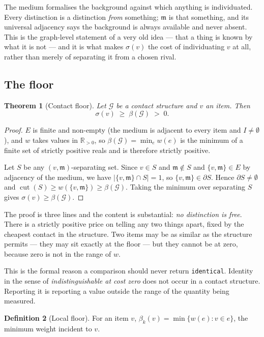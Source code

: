 \documentclass[11pt,twocolumn,a4paper]{article}
\theoremstyle{plain}
\newtheorem{theorem}{Theorem}[section]
\theoremstyle{definition}
\newtheorem{definition}[theorem]{Definition}
\theoremstyle{remark}
\newcommand{\flo}{\beta}                       %
\newcommand{\sep}{\sigma}                      %
\newcommand{\med}{\mathfrak{m}}                %
\newcommand{\Gph}{\mathcal{G}}
\newcommand{\Edg}{E}
\newcommand{\weight}{w}
\newcommand{\Rp}{\mathbb{R}_{>0}}
\DeclareMathOperator{\cut}{cut}
\begin{document}
The medium formalises the background against which anything is
individuated. Every distinction is a distinction \emph{from} something;
$\med$ is that something, and its universal adjacency says the
background is always available and never absent. This is the graph-level
statement of a very old idea --- that a thing is known by what it is not
--- and it is what makes $\sep(v)$ the cost of individuating $v$ at all,
rather than merely of separating it from a chosen rival.

\subsection{The floor}

\begin{theorem}[Contact floor]
\label{thm:floor}
Let $\Gph$ be a contact structure and $v$ an item. Then
\[
  \sep(v)\;\ge\;\flo(\Gph)\;>\;0.
\]
\end{theorem}

\begin{proof}
$\Edg$ is finite and non-empty (the medium is adjacent to every item and
$I\neq\emptyset$), and $\weight$ takes values in $\Rp$, so
$\flo(\Gph)=\min_{e}\weight(e)$ is the minimum of a finite set of
strictly positive reals and is therefore strictly positive.

Let $S$ be any $(v,\med)$-separating set. Since $v\in S$ and
$\med\notin S$ and $\{v,\med\}\in\Edg$ by adjacency of the medium, we
have $|\{v,\med\}\cap S|=1$, so $\{v,\med\}\in\partial S$. Hence
$\partial S\neq\emptyset$ and
$\cut(S)\ge\weight(\{v,\med\})\ge\flo(\Gph)$. Taking the minimum over
separating $S$ gives $\sep(v)\ge\flo(\Gph)$.
\end{proof}

The proof is three lines and the content is substantial: \emph{no
distinction is free}. There is a strictly positive price on telling any
two things apart, fixed by the cheapest contact in the structure. Two
items may be as similar as the structure permits --- they may sit
exactly at the floor --- but they cannot be at zero, because zero is not
in the range of $\weight$.

This is the formal reason a comparison should never return
\texttt{identical}. Identity in the sense of \emph{indistinguishable at
cost zero} does not occur in a contact structure. Reporting it is
reporting a value outside the range of the quantity being measured.

\begin{definition}[Local floor]
\label{def:localfloor}
For an item $v$, $\flo_k(v)=\min\{\weight(e): v\in e\}$, the minimum
weight incident to $v$.
\end{definition}
\end{document}
